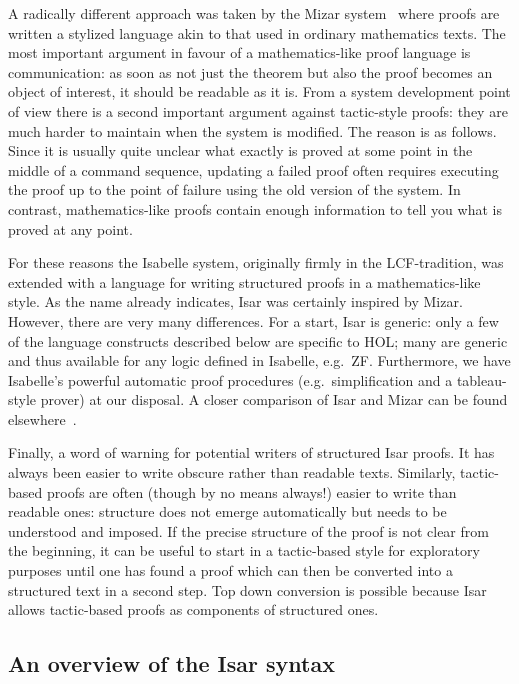 \documentclass[11pt,a4paper]{article}
\begin{document}
A radically different approach was taken by the Mizar
system~\cite{Mizar} where proofs are written a stylized language akin
to that used in ordinary mathematics texts. The most important
argument in favour of a mathematics-like proof language is
communication: as soon as not just the theorem but also the proof
becomes an object of interest, it should be readable as it is.  From a
system development point of view there is a second important argument
against tactic-style proofs: they are much harder to maintain when the
system is modified. The reason is as follows. Since it is usually
quite unclear what exactly is proved at some point in the middle of a
command sequence, updating a failed proof often requires executing the
proof up to the point of failure using the old version of the system.
In contrast, mathematics-like proofs contain enough information
to tell you what is proved at any point.

For these reasons the Isabelle system, originally firmly in the
LCF-tradition, was extended with a language for writing structured
proofs in a mathematics-like style. As the name already indicates,
Isar was certainly inspired by Mizar. However, there are very many
differences. For a start, Isar is generic: only a few of the language
constructs described below are specific to HOL; many are generic and
thus available for any logic defined in Isabelle, e.g.\ ZF.
Furthermore, we have Isabelle's powerful automatic proof procedures
(e.g.\ simplification and a tableau-style prover) at our disposal.
A closer comparison of Isar and Mizar can be found
elsewhere~\cite{Isar-Mizar}.

Finally, a word of warning for potential writers of structured Isar
proofs.  It has always been easier to write obscure rather than
readable texts. Similarly, tactic-based proofs are often (though by no
means always!) easier to write than readable ones: structure does not
emerge automatically but needs to be understood and imposed. If the
precise structure of the proof is not clear from the beginning, it can
be useful to start in a tactic-based style for exploratory purposes
until one has found a proof which can then be converted into a
structured text in a second step. Top down conversion is possible
because Isar allows tactic-based proofs as components of structured
ones.

\subsection{An overview of the Isar syntax}
\end{document}
